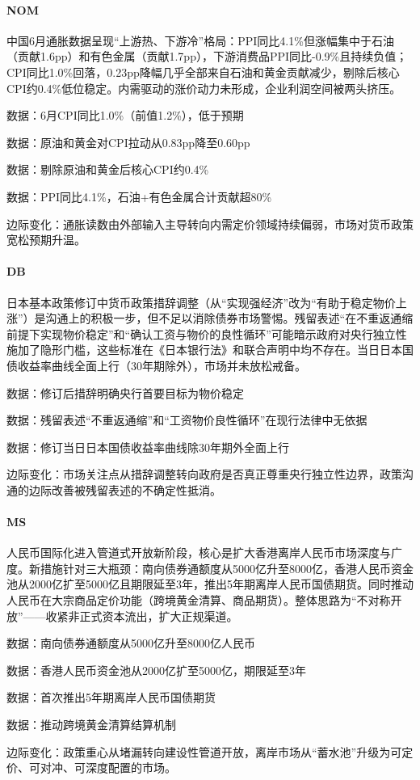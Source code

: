 \documentclass[11pt]{ctexart}
\begin{document}
\paragraph{NOM} 中国6月通胀数据呈现“上游热、下游冷”格局：PPI同比4.1\%但涨幅集中于石油（贡献1.6pp）和有色金属（贡献1.7pp），下游消费品PPI同比-0.9\%且持续负值；CPI同比1.0\%回落，0.23pp降幅几乎全部来自石油和黄金贡献减少，剔除后核心CPI约0.4\%低位稳定。内需驱动的涨价动力未形成，企业利润空间被两头挤压。
{\small\color{refgray}数据：6月CPI同比1.0\%（前值1.2\%），低于预期\par}
{\small\color{refgray}数据：原油和黄金对CPI拉动从0.83pp降至0.60pp\par}
{\small\color{refgray}数据：剔除原油和黄金后核心CPI约0.4\%\par}
{\small\color{refgray}数据：PPI同比4.1\%，石油+有色金属合计贡献超80\%\par}
{\small\color{refgray}边际变化：通胀读数由外部输入主导转向内需定价领域持续偏弱，市场对货币政策宽松预期升温。\par}
\paragraph{DB} 日本基本政策修订中货币政策措辞调整（从“实现强经济”改为“有助于稳定物价上涨”）是沟通上的积极一步，但不足以消除债券市场警惕。残留表述“在不重返通缩前提下实现物价稳定”和“确认工资与物价的良性循环”可能暗示政府对央行独立性施加了隐形门槛，这些标准在《日本银行法》和联合声明中均不存在。当日日本国债收益率曲线全面上行（30年期除外），市场并未放松戒备。
{\small\color{refgray}数据：修订后措辞明确央行首要目标为物价稳定\par}
{\small\color{refgray}数据：残留表述“不重返通缩”和“工资物价良性循环”在现行法律中无依据\par}
{\small\color{refgray}数据：修订当日日本国债收益率曲线除30年期外全面上行\par}
{\small\color{refgray}边际变化：市场关注点从措辞调整转向政府是否真正尊重央行独立性边界，政策沟通的边际改善被残留表述的不确定性抵消。\par}
\paragraph{MS} 人民币国际化进入管道式开放新阶段，核心是扩大香港离岸人民币市场深度与广度。新措施针对三大瓶颈：南向债券通额度从5000亿升至8000亿，香港人民币资金池从2000亿扩至5000亿且期限延至3年，推出5年期离岸人民币国债期货。同时推动人民币在大宗商品定价功能（跨境黄金清算、商品期货）。整体思路为“不对称开放”——收紧非正式资本流出，扩大正规渠道。
{\small\color{refgray}数据：南向债券通额度从5000亿升至8000亿人民币\par}
{\small\color{refgray}数据：香港人民币资金池从2000亿扩至5000亿，期限延至3年\par}
{\small\color{refgray}数据：首次推出5年期离岸人民币国债期货\par}
{\small\color{refgray}数据：推动跨境黄金清算结算机制\par}
{\small\color{refgray}边际变化：政策重心从堵漏转向建设性管道开放，离岸市场从“蓄水池”升级为可定价、可对冲、可深度配置的市场。\par}
\end{document}
